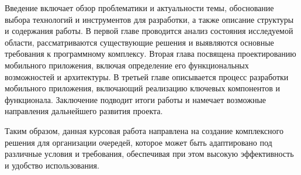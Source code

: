 Введение включает обзор проблематики и актуальности темы,
обоснование выбора технологий и инструментов для разработки,
а также описание структуры и содержания работы.
В первой главе проводится анализ состояния исследуемой области,
рассматриваются существующие решения и выявляются основные требования
к программному комплексу.
Вторая глава посвящена проектированию мобильного приложения,
включая определение его функциональных возможностей и архитектуры.
В третьей главе описывается процесс разработки мобильного приложения,
включающий реализацию ключевых компонентов и функционала.
Заключение подводит итоги работы
и намечает возможные направления дальнейшего развития проекта.\par
Таким образом, данная курсовая работа направлена на создание комплексного
решения для организации очередей, которое может быть адаптировано
под различные условия и требования,
обеспечивая при этом высокую эффективность и удобство использования.

